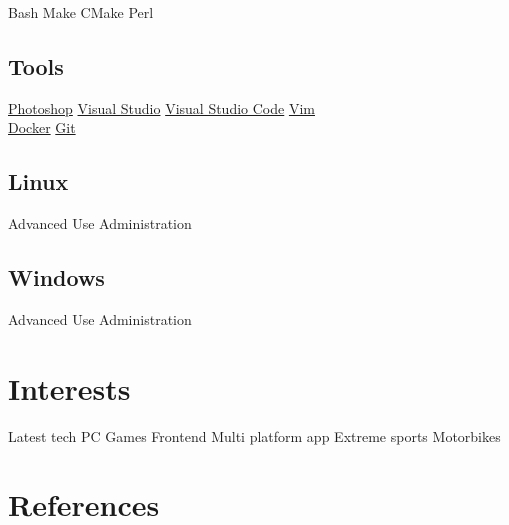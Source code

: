 \documentclass[a4paper,final]{deedy-resume}%
\newcommand{\mySep}{{\color{black!40!white}\textbullet{}}}
\newcommand{\mySmallSpace}{\vspace{3pt}}
\begin{document}
\begin{minipage}[t]{0.33\textwidth}
	{\small
		Bash \mySep{}
		Make \mySep{}
		CMake \mySep{}
		Perl
		\mySmallSpace{}
	}

	\sectionspace %

	\subsection{Tools}
	{\small
		\href{http://www.adobe.com/products/photoshop.html}{Photoshop} \mySep{}
		\href{https://www.visualstudio.com/}{Visual Studio} \mySep{}
		\href{https://code.visualstudio.com/}{Visual Studio Code} \mySep{}
		\href{http://www.vim.org/}{Vim} \\
		\href{https://www.docker.com/}{Docker} \mySep{}
		\href{https://git-scm.com/}{Git}
	}

	\sectionspace %

	\subsection{Linux}
	Advanced Use \mySep{}
	Administration

	\sectionspace %

	\subsection{Windows}
	Advanced Use \mySep{}
	Administration

	\section{Interests}
	{Latest tech} \mySep{}
	{PC Games} \mySep{}
	{Frontend} \mySep{}
	{Multi platform app} \mySep{}
	{Extreme sports} \mySep{}
	{Motorbikes}
	\section{References}

	\href{https://github.com/rajzik}{}

	\sectionspace %



\end{minipage} %
\end{document}

